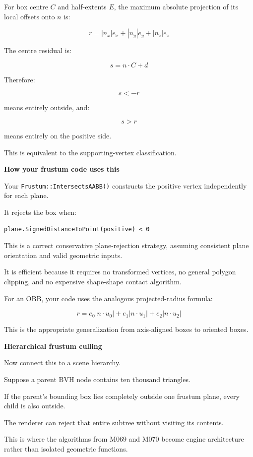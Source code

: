 For box centre \(C\) and half-extents \(E\), the maximum absolute projection of its local offsets onto \(n\) is:

\[
\boxed{ r=|n_x|e_x+|n_y|e_y+|n_z|e_z }
\]

The centre residual is:

\[
s=n\cdot C+d
\]

Therefore:

\[
s<-r
\]

means entirely outside, and:

\[
s>r
\]

means entirely on the positive side.

This is equivalent to the supporting-vertex classification.

\textbf{How your frustum code uses this}

Your \texttt{Frustum::IntersectsAABB()} constructs the positive vertex independently for each plane.

It rejects the box when:

\begin{verbatim}
plane.SignedDistanceToPoint(positive) < 0
\end{verbatim}

This is a correct conservative plane-rejection strategy, assuming consistent plane orientation and valid geometric inputs.

It is efficient because it requires no transformed vertices, no general polygon clipping, and no expensive shape-shape contact algorithm.

For an OBB, your code uses the analogous projected-radius formula:

\[
r= e_0|n\cdot u_0| + e_1|n\cdot u_1| + e_2|n\cdot u_2|
\]

This is the appropriate generalization from axis-aligned boxes to oriented boxes.

\textbf{Hierarchical frustum culling}

Now connect this to a scene hierarchy.

Suppose a parent BVH node contains ten thousand triangles.

If the parent's bounding box lies completely outside one frustum plane, every child is also outside.

The renderer can reject that entire subtree without visiting its contents.

This is where the algorithms from M069 and M070 become engine architecture rather than isolated geometric functions.


